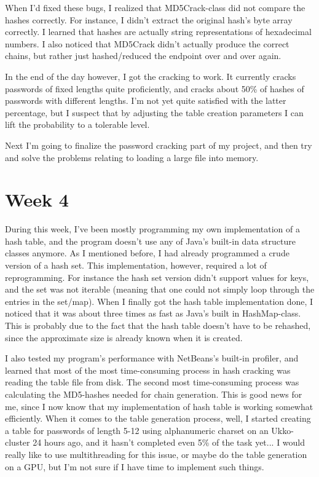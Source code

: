\documentclass[a4paper, 11pt, finnish]{article}
\begin{document}
When I'd fixed these bugs, I realized that MD5Crack-class did not compare the hashes correctly. For instance, I didn't extract the original hash's byte array correctly. I learned that hashes are actually string representations of hexadecimal numbers. I also noticed that MD5Crack didn't actually produce the correct chains, but rather just hashed/reduced the endpoint over and over again.

In the end of the day however, I got the cracking to work. It currently cracks passwords of fixed lengths quite proficiently, and cracks about 50\% of hashes of passwords with different lengths. I'm not yet quite satisfied with the latter percentage, but I suspect that by adjusting the table creation parameters I can lift the probability to a tolerable level.

Next I'm going to finalize the password cracking part of my project, and then try and solve the problems relating to loading a large file into memory.

\section*{Week 4}
During this week, I've been mostly programming my own implementation of a hash table, and the program doesn't use any of Java's built-in data structure classes anymore. As I mentioned before, I had already programmed a crude version of a hash set. This implementation, however, required a lot of reprogramming. For instance the hash set version didn't support values for keys, and the set was not iterable (meaning that one could not simply loop through the entries in the set/map). When I finally got the hash table implementation done, I noticed that it was about three times as fast as Java's built in HashMap-class. This is probably due to the fact that the hash table doesn't have to be rehashed, since the approximate size is already known when it is created.

I also tested my program's performance with NetBeans's built-in profiler, and learned that most of the most time-consuming process in hash cracking was reading the table file from disk. The second most time-consuming process was calculating the MD5-hashes needed for chain generation. This is good news for me, since I now know that my implementation of hash table is working somewhat efficiently. When it comes to the table generation process, well, I started creating a table for passwords of length 5-12 using alphanumeric charset on an Ukko-cluster 24 hours ago, and it hasn't completed even 5\% of the task yet... I would really like to use multithreading for this issue, or maybe do the table generation on a GPU, but I'm not sure if I have time to implement such things.
\end{document}
